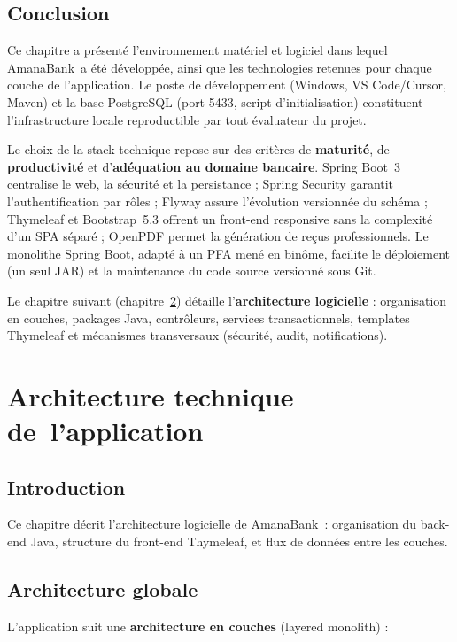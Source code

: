 \documentclass[11pt,a4paper,oneside]{report}
\newcommand{\nomapplication}{AmanaBank}
\begin{document}
\section{Conclusion}

Ce chapitre a présenté l'environnement matériel et logiciel dans lequel \nomapplication\ a été développée, ainsi que les technologies retenues pour chaque couche de l'application. Le poste de développement (Windows, VS Code/Cursor, Maven) et la base PostgreSQL (port 5433, script d'initialisation) constituent l'infrastructure locale reproductible par tout évaluateur du projet.

Le choix de la stack technique repose sur des critères de \textbf{maturité}, de \textbf{productivité} et d'\textbf{adéquation au domaine bancaire}. Spring Boot~3 centralise le web, la sécurité et la persistance ; Spring Security garantit l'authentification par rôles ; Flyway assure l'évolution versionnée du schéma ; Thymeleaf et Bootstrap~5.3 offrent un front-end responsive sans la complexité d'un SPA séparé ; OpenPDF permet la génération de reçus professionnels. Le monolithe Spring Boot, adapté à un PFA mené en binôme, facilite le déploiement (un seul JAR) et la maintenance du code source versionné sous Git.

Le chapitre suivant (chapitre~\ref{ch:archi}) détaille l'\textbf{architecture logicielle} : organisation en couches, packages Java, contrôleurs, services transactionnels, templates Thymeleaf et mécanismes transversaux (sécurité, audit, notifications).

\chapter{Architecture technique de~l'application}
\label{ch:archi}

\section{Introduction}

Ce chapitre décrit l'architecture logicielle de \nomapplication\ : organisation du back-end Java, structure du front-end Thymeleaf, et flux de données entre les couches.

\section{Architecture globale}

L'application suit une \textbf{architecture en couches} (layered monolith) :
\end{document}
